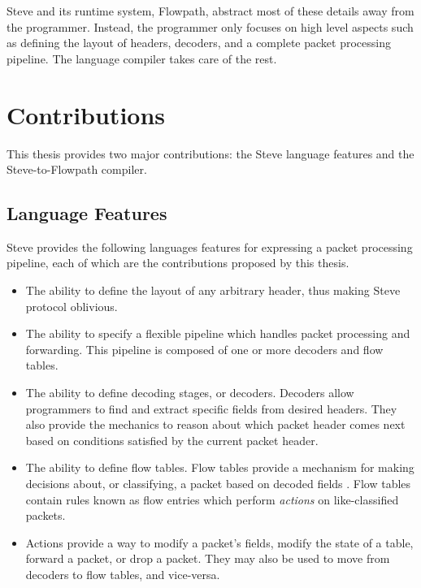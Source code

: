 Steve and its runtime system, Flowpath, abstract most of these details away from the programmer. Instead, the programmer only focuses on high level aspects such as defining the layout of headers, decoders, and a complete packet processing pipeline. The language compiler takes care of the rest.

\section{Contributions}


This thesis provides two major contributions: the Steve language features and the Steve-to-Flowpath compiler.

\subsection{Language Features}

Steve provides the following languages features for expressing a packet processing pipeline, each of which are the contributions proposed by this thesis.

\begin{itemize}
\item The ability to define the layout of any arbitrary header, thus making Steve protocol oblivious.

\item The ability to specify a flexible pipeline which handles packet processing and forwarding. This pipeline is composed of one or more decoders and flow tables.

\item The ability to define decoding stages, or decoders. Decoders allow programmers to find and extract specific fields from desired headers. They also provide the mechanics to reason about which packet header comes next based on conditions satisfied by the current packet header.

\item The ability to define flow tables. Flow tables provide a mechanism for making decisions about, or classifying, a packet based on decoded fields \cite{openflow_spec}. Flow tables contain rules known as flow entries which perform \textit{actions} on like-classified packets.

\item
Actions provide a way to modify a packet's fields, modify the state of a table, forward a packet, or drop a packet. They may also be used to move from decoders to flow tables, and vice-versa.
\end{itemize}


